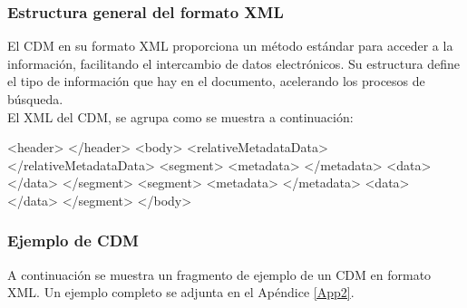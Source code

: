 \subsubsection*{Estructura general del formato XML}
El CDM en su formato \ac{XML} proporciona un m\'etodo est\'andar para acceder a la informaci\'on, facilitando el intercambio de datos electr\'onicos. Su estructura define el tipo de informaci\'on que hay en el documento, acelerando los procesos de b\'usqueda.\\
El XML del CDM, se agrupa como se muestra a continuaci\'on:

\begin{verbbox}
<header>
</header>
<body>
  <relativeMetadataData>
  </relativeMetadataData>
  <segment>
    <metadata>
    </metadata>
    <data>
    </data>
  </segment>
  <segment>
    <metadata>
    </metadata>
    <data>
    </data>
  </segment>
</body>\\
\end{verbbox}

\begin{center}
\end{center}


\subsubsection*{Ejemplo de CDM}
A continuaci\'on se muestra un fragmento de ejemplo de un CDM en formato XML. Un ejemplo completo se adjunta en el Ap\'endice \ref{App2}.\\

